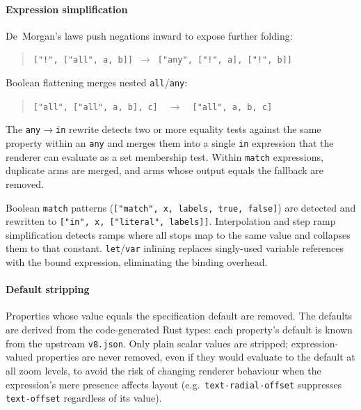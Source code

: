 \paragraph{Expression simplification}
De~Morgan's laws push negations inward to expose further folding:
%
\begin{quote}
\texttt{["!",~["all",~a,~b]]}~$\to$~\texttt{["any",~["!",~a],~["!",~b]]}
\end{quote}
%
\noindent Boolean flattening merges nested \texttt{all}/\texttt{any}:
%
\begin{quote}
\texttt{["all",~["all",~a,~b],~c]}~~$\to$~~\texttt{["all",~a,~b,~c]}
\end{quote}
%
\noindent The \texttt{any}$\to$\texttt{in} rewrite detects two or more equality tests against the same property within an \texttt{any} and merges them into a single \texttt{in} expression that the renderer can evaluate as a set membership test.
Within \texttt{match} expressions, duplicate arms are merged, and arms whose output equals the fallback are removed.

\begin{sloppypar}
Boolean \texttt{match} patterns (\texttt{["match",\allowbreak~x,\allowbreak~labels,\allowbreak~true,\allowbreak~false]}) are detected and rewritten to \texttt{["in",\allowbreak~x,\allowbreak~["literal",\allowbreak~labels]]}.
Interpolation and step ramp simplification detects ramps where all stops map to the same value and collapses them to that constant.
\texttt{let}/\texttt{var} inlining replaces singly-used variable references with the bound expression, eliminating the binding overhead.
\end{sloppypar}

\paragraph{Default stripping}
Properties whose value equals the specification default are removed.
The defaults are derived from the code-generated Rust types: each property's default is known from the upstream \texttt{v8.json}.
Only plain scalar values are stripped; expression-valued properties are never removed, even if they would evaluate to the default at all zoom levels, to avoid the risk of changing renderer behaviour when the expression's mere presence affects layout (e.g.\ \texttt{text-radial-offset} suppresses \texttt{text-offset} regardless of its value).

